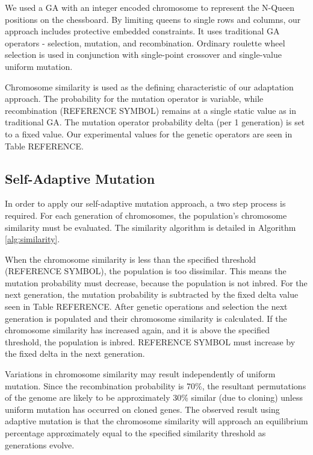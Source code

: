 \documentclass[conference]{IEEEtran}
\begin{document}
We used a GA with an integer encoded chromosome to represent the N-Queen positions on the chessboard. By limiting queens to single rows and columns, our approach includes protective embedded constraints. It uses traditional GA operators - selection, mutation, and recombination. Ordinary roulette wheel selection is used in conjunction with single-point crossover and single-value uniform mutation. 

Chromosome similarity is used as the defining characteristic of our adaptation approach. The probability for the mutation operator is variable, while recombination ({REFERENCE SYMBOL}) remains at a single static value as in traditional GA. The mutation operator probability delta (per 1 generation) is set to a fixed value. Our experimental values for the genetic operators are seen in Table {REFERENCE}. 

\subsection{Self-Adaptive Mutation}
In order to apply our self-adaptive mutation approach, a two step process is required. For each generation of chromosomes, the population's chromosome similarity must be evaluated. The similarity algorithm is detailed in Algorithm \ref{alg:similarity}.  

When the chromosome similarity is less than the specified threshold ({REFERENCE SYMBOL}), the population is too dissimilar. This means the mutation probability must decrease, because the population is not inbred. For the next generation, the mutation probability is subtracted by the fixed delta value seen in Table {REFERENCE}. After genetic operations and selection the next generation is populated and their chromosome similarity is calculated. If the chromosome similarity has increased again, and it is above the specified threshold, the population is inbred. {REFERENCE SYMBOL} must increase by the fixed delta in the next generation.

Variations in chromosome similarity may result independently of uniform mutation. Since the recombination probability is 70\%, the resultant permutations of the genome are likely to be approximately 30\% similar (due to cloning) unless uniform mutation has occurred on cloned genes. The observed result using adaptive mutation is that the chromosome similarity will approach an equilibrium percentage approximately equal to the specified similarity threshold as generations evolve.
\end{document}
